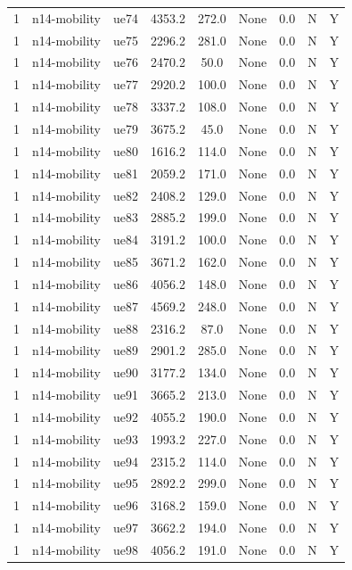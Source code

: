 \begin{table}[ht]
\begin{tabular}{|c|c|c|c|c|c|c|c|c|}
1 & n14-mobility & ue74 & 4353.2 & 272.0 & None & 0.0 & N & Y \\
1 & n14-mobility & ue75 & 2296.2 & 281.0 & None & 0.0 & N & Y \\
1 & n14-mobility & ue76 & 2470.2 & 50.0 & None & 0.0 & N & Y \\
1 & n14-mobility & ue77 & 2920.2 & 100.0 & None & 0.0 & N & Y \\
1 & n14-mobility & ue78 & 3337.2 & 108.0 & None & 0.0 & N & Y \\
1 & n14-mobility & ue79 & 3675.2 & 45.0 & None & 0.0 & N & Y \\
1 & n14-mobility & ue80 & 1616.2 & 114.0 & None & 0.0 & N & Y \\
1 & n14-mobility & ue81 & 2059.2 & 171.0 & None & 0.0 & N & Y \\
1 & n14-mobility & ue82 & 2408.2 & 129.0 & None & 0.0 & N & Y \\
1 & n14-mobility & ue83 & 2885.2 & 199.0 & None & 0.0 & N & Y \\
1 & n14-mobility & ue84 & 3191.2 & 100.0 & None & 0.0 & N & Y \\
1 & n14-mobility & ue85 & 3671.2 & 162.0 & None & 0.0 & N & Y \\
1 & n14-mobility & ue86 & 4056.2 & 148.0 & None & 0.0 & N & Y \\
1 & n14-mobility & ue87 & 4569.2 & 248.0 & None & 0.0 & N & Y \\
1 & n14-mobility & ue88 & 2316.2 & 87.0 & None & 0.0 & N & Y \\
1 & n14-mobility & ue89 & 2901.2 & 285.0 & None & 0.0 & N & Y \\
1 & n14-mobility & ue90 & 3177.2 & 134.0 & None & 0.0 & N & Y \\
1 & n14-mobility & ue91 & 3665.2 & 213.0 & None & 0.0 & N & Y \\
1 & n14-mobility & ue92 & 4055.2 & 190.0 & None & 0.0 & N & Y \\
1 & n14-mobility & ue93 & 1993.2 & 227.0 & None & 0.0 & N & Y \\
1 & n14-mobility & ue94 & 2315.2 & 114.0 & None & 0.0 & N & Y \\
1 & n14-mobility & ue95 & 2892.2 & 299.0 & None & 0.0 & N & Y \\
1 & n14-mobility & ue96 & 3168.2 & 159.0 & None & 0.0 & N & Y \\
1 & n14-mobility & ue97 & 3662.2 & 194.0 & None & 0.0 & N & Y \\
1 & n14-mobility & ue98 & 4056.2 & 191.0 & None & 0.0 & N & Y \\

\end{tabular}
\end{table}
